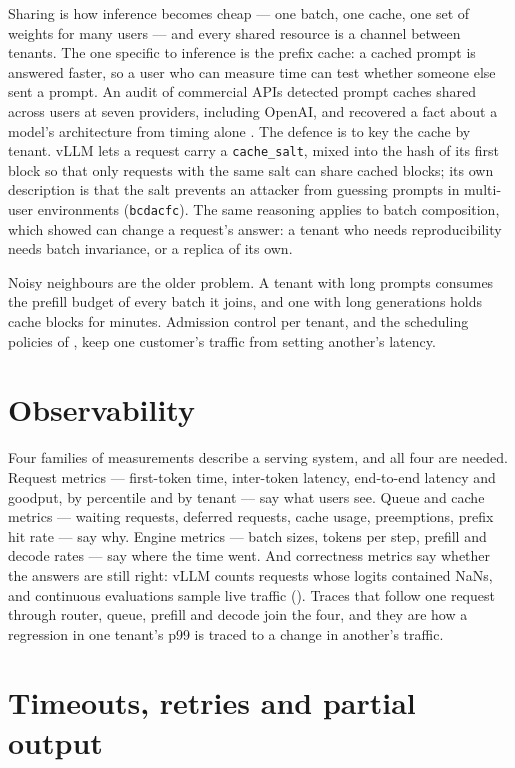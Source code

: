 Sharing is how inference becomes cheap --- one batch, one cache, one set of
weights for many users --- and every shared resource is a channel between
tenants. The one specific to inference is the prefix cache: a cached prompt is
answered faster, so a user who can measure time can test whether someone else
sent a prompt. An audit of commercial APIs detected prompt caches shared across
users at seven providers, including OpenAI, and recovered a fact about a model's
architecture from timing alone \cite{gu2025auditing}. The defence is to key the
cache by tenant. vLLM lets a request carry a \texttt{cache\_salt}, mixed into the
hash of its first block so that only requests with the same salt can share
cached blocks; its own description is that the salt prevents an attacker from
guessing prompts in multi-user environments (\texttt{bcdacfc}). The same
reasoning applies to batch composition, which  showed
can change a request's answer: a tenant who needs reproducibility needs batch
invariance, or a replica of its own.

Noisy neighbours are the older problem. A tenant with long prompts consumes the
prefill budget of every batch it joins, and one with long generations holds
cache blocks for minutes. Admission control per tenant, and the scheduling
policies of , keep one customer's traffic from setting
another's latency.

\section{Observability}

Four families of measurements describe a serving system, and all four are
needed. Request metrics --- first-token time, inter-token latency, end-to-end
latency and goodput, by percentile and by tenant --- say what users see. Queue
and cache metrics --- waiting requests, deferred requests, cache usage,
preemptions, prefix hit rate --- say why. Engine metrics --- batch sizes, tokens
per step, prefill and decode rates --- say where the time went. And correctness
metrics say whether the answers are still right: vLLM counts requests whose
logits contained NaNs, and continuous evaluations sample live traffic
(). Traces that follow one request through router,
queue, prefill and decode join the four, and they are how a regression in one
tenant's p99 is traced to a change in another's traffic.

\section{Timeouts, retries and partial output}

